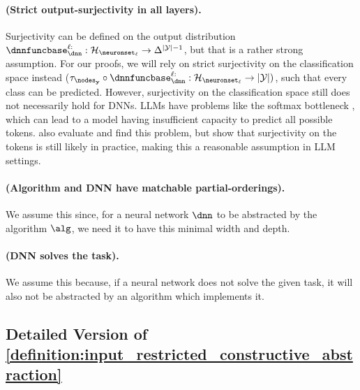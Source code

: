 \paragraph{ (Strict output-surjectivity in all layers).}
Surjectivity can be defined on the output distribution $\dnnfunclayer{\layer:}: \hiddenspace_{\neuronset_{\layer}} \to \Delta^{|\calY|-1}$, but that is a rather strong assumption.
For our proofs, we will rely on strict surjectivity on the classification space instead ($\abstractionmap_{\nodesoutput} \circ \dnnfunclayer{\layer:}: \hiddenspace_{\neuronset_{\layer}} \to |\calY|)
$, such that every class can be predicted.
However, surjectivity on the classification space still does not necessarily hold for DNNs. 
LLMs have problems like the softmax bottleneck \citep{yang2018breaking}, which can lead to a model having insufficient capacity to predict all possible tokens. 
\citet{grivas-etal-2022-low} also evaluate and find this problem, but show that surjectivity on the tokens is still likely in practice, making this a reasonable assumption in LLM settings.

\paragraph{ (Algorithm and DNN have matchable partial-orderings).}
We assume this since, for a neural network $\dnn$ to be abstracted by the algorithm $\alg$, we need it to have this minimal width and depth.

\paragraph{ (DNN solves the task).} We assume this because, if a neural network does not solve the given task, it will also not be abstracted by an algorithm which implements it.

\subsection{Detailed Version of \texorpdfstring{\cref{definition:input_restricted_constructive_abstraction}}{Definition}}\label{appsec:detailed_def_IRCA}

